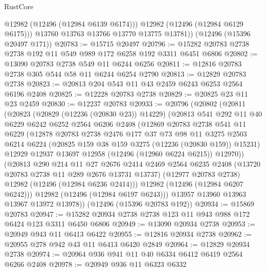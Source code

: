 \begin{lexlean}{RustCore}
\begin{coremodule}
            @12982
            (@12496 (@12984 @6139 @6174)))
          @12982
          (@12496 (@12984 @6129 @6175)))
        @13760
        @13763
        @13766
        @13770
        @13775
        @13781))
    (@12496 (@15396 @20497 @171))
@20783 := @15715 @20497
@20796 := @15282 @20783 @2738 @2738 @192 @11 @549 @989 @172 @6258 @192 @3311 @6451 @6806
@20802 := @13090 @20783 @2738 @549 @11 @6244 @6256
@20811 := @12816 @20783 @2738 @305 @544 @58 @11 @6244 @6254 @2790
@20813 := @12829 @20783 @2738
@20823 := @20813 @204 @543 @11 @43 @2459 @6243 @6253 @2564 @6196 @2408
@20825 := @12228 @20783 @2738
@20829 := @20825 @23 @11 @23 @2459
@20830 := @12237 @20783
@20933 := @20796
    (@20802
      (@20811
        (@20823
          (@20829 (@12236 (@20830 @23)) @14229)
          (@20813
            @541
            @292
            @11
            @40
            @6229
            @6242
            @6252
            @2564
            @6206
            @2408
            (@12869
              @20783
              @2738
              @541
              @11
              @6229
              (@12878
                @20783
                @2738
                @2476
                @177
                @37
                @73
                @98
                @11
                @3275
                @2503
                @6214
                @6224
                (@20825 @159 @38 @159 @3275 (@12236 (@20830 @159)) @15231)
                @12929
                @12937
                @13697
                @12958
                (@12496 (@12960 @6224 @6215))
                @12970))
            (@20813
              @290
              @214
              @11
              @27
              @2676
              @2414
              @2469
              @2564
              @6235
              @2408
              (@13720 @20783 @2738 @11 @289 @2676 @13731 @13737)
              (@12977 @20783 @2738)
              @12982
              (@12496 (@12984 @6236 @2414)))
            @12982
            (@12496 (@12984 @6207 @6242)))
          @12982
          (@12496 (@12984 @6197 @6243)))
        @13957
        @13960
        @13963
        @13967
        @13972
        @13978))
    (@12496 (@15396 @20783 @192))
@20934 := @15869 @20783
@20947 := @15282 @20934 @2738 @2738 @123 @11 @943 @988 @172 @6424 @123 @3311 @6450 @6806
@20949 := @13090 @20934 @2738
@20953 := @20949 @943 @11 @6413 @6422
@20955 := @12816 @20934 @2738
@20962 := @20955 @278 @942 @43 @11 @6413 @6420 @2849
@20964 := @12829 @20934 @2738
@20974 := @20964 @936 @941 @11 @40 @6334 @6412 @6419 @2564 @6266 @2408
@20978 := @20949 @936 @11 @6323 @6332

\end{coremodule}
\end{lexlean}
